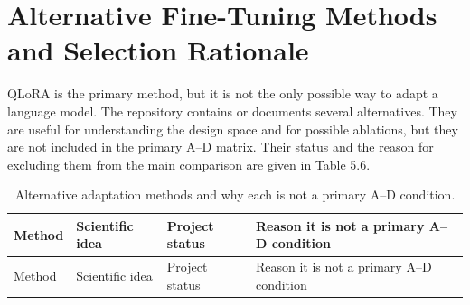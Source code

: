 \section{Alternative Fine-Tuning Methods and Selection Rationale}

QLoRA is the primary method, but it is not the only possible way to adapt a language model. The repository contains or documents several alternatives. They are useful for understanding the design space and for possible ablations, but they are not included in the primary A--D matrix. Their status and the reason for excluding them from the main comparison are given in Table 5.6.

\begingroup\footnotesize\setlength{\tabcolsep}{3pt}\sloppy
\begin{longtable}[]{@{}
  >{\raggedright\arraybackslash}p{}
  >{\raggedright\arraybackslash}p{}
  >{\raggedright\arraybackslash}p{}
  >{\raggedright\arraybackslash}p{}@{}}
\caption{Alternative adaptation methods and why each is not a primary A--D condition.}\tabularnewline
\toprule\noalign{}
\begin{minipage}[b]{\linewidth}\raggedright
Method
\end{minipage} & \begin{minipage}[b]{\linewidth}\raggedright
Scientific idea
\end{minipage} & \begin{minipage}[b]{\linewidth}\raggedright
Project status
\end{minipage} & \begin{minipage}[b]{\linewidth}\raggedright
Reason it is not a primary A--D condition
\end{minipage} \\
\midrule\noalign{}
\endfirsthead
\toprule\noalign{}
\begin{minipage}[b]{\linewidth}\raggedright
Method
\end{minipage} & \begin{minipage}[b]{\linewidth}\raggedright
Scientific idea
\end{minipage} & \begin{minipage}[b]{\linewidth}\raggedright
Project status
\end{minipage} & \begin{minipage}[b]{\linewidth}\raggedright
Reason it is not a primary A--D condition
\end{minipage} \\

\end{longtable}
